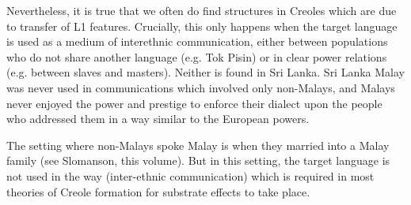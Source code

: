 Nevertheless, it is true that we often do find structures in Creoles which are due to transfer of L1 features. Crucially, this only happens when the target language is used as a medium of interethnic communication, either between populations who do not share another language (e.g. Tok Pisin) or in clear power relations (e.g. between slaves and masters). Neither is found in Sri Lanka. Sri Lanka Malay was never used in communications which involved only non-Malays, and Malays never enjoyed the power and prestige to enforce their dialect upon the people who addressed them in a way similar to the European powers.

The setting where non-Malays spoke Malay is when they married into a Malay family (see Slomanson, this volume). But in this setting, the target language is not used in the way (inter-ethnic communication) which is required in most theories of Creole formation for substrate effects to take place.



